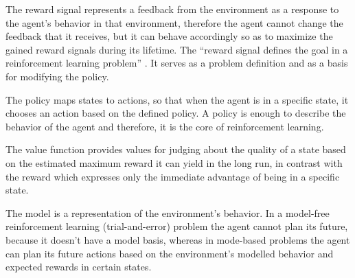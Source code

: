 The reward signal represents a feedback from the environment as a response to the agent’s behavior in that environment, therefore the agent cannot change the feedback that it receives, but it can behave accordingly so as to maximize the gained reward signals during its lifetime. The “reward signal defines the goal in a reinforcement learning problem” \cite{Sutton}. It serves as a problem definition and as a basis for modifying the policy.

The policy maps states to actions, so that when the agent is in a specific state, it chooses an action based on the defined policy. A policy is enough to describe the behavior of the agent and therefore, it is the core of reinforcement learning.

The value function provides values for judging about the quality of a state based on the estimated maximum reward it can yield in the long run, in contrast with the reward which expresses only the immediate advantage of being in a specific state.

The model is a representation of the environment’s behavior. In a model-free reinforcement learning (trial-and-error) problem the agent cannot plan its future, because it doesn’t have a model basis, whereas in mode-based problems the agent can plan its future actions based on the environment’s modelled behavior and expected rewards in certain states.
